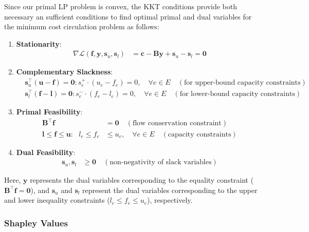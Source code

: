 \documentclass{article} %
\theoremstyle{bfnote}
\begin{document}
Since our primal LP problem is convex, the  KKT conditions provide both necessary an sufficient conditions to find optimal primal and dual variables for the minimum cost circulation problem as follows:
\begin{enumerate}
	\item \textbf{Stationarity}:
	\[
	\begin{aligned}
		\nabla \mathcal{L}(\bm{f}, \bm{y}, \bm{s}_{u}, \bm{s}_{l}) &= \bm{c} - \bm{B}\bm{y} + \bm{s}_{u} - \bm{s}_{l} = \bm{0}
	\end{aligned}
	\]
	
	\item \textbf{Complementary Slackness}:
	\[
	\begin{aligned}
		& \bm{s}_u^{\top}(\bm{u} - \bm{f}) = \bm{0}:  s_e^+ \cdot (u_e - f_e)= 0, \quad \forall e \in E \quad (\text{for upper-bound capacity constraints}) \\
		& \bm{s}_l^{\top}(\bm{f} - \bm{l}) = \bm{0}:  s_e^- \cdot (f_e - l_e)= 0, \quad \forall e \in E \quad(\text{for lower-bound capacity constraints})
	\end{aligned}
	\]
	
	\item \textbf{Primal Feasibility}:
	\[
	\begin{aligned}
		\bm{B}^{\top}\bm{f} &= \bm{0} \quad (\text{flow conservation constraint}) \\
		\bm{l} \leq \bm{f} \leq \bm{u}: \hspace{8pt} l_e \leq f_e &\leq u_e, \quad \forall e \in E \quad (\text{capacity constraints})
	\end{aligned}
	\]
	
	\item \textbf{Dual Feasibility}:
	\[
	\begin{aligned}
		\bm{s}_{u}, \bm{s}_{l} &\geq \bm{0} \quad (\text{non-negativity of slack variables})
	\end{aligned}
	\]
\end{enumerate}


Here, \(\bm{y}\) represents the dual variables corresponding to the equality constraint (\(\bm{B}^{\top}\bm{f} = \bm{0}\)), and \(\bm{s}_{u}\) and \(\bm{s}_{l}\) represent the dual variables corresponding to the upper and lower inequality constraints (\(l_e \leq f_e \leq u_e\)), respectively.


\subsubsection{Shapley Values}
\end{document}
